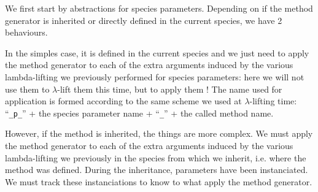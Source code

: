 We first start by abstractions for species parameters. Depending on if
the method generator is inherited or directly defined in the current
species, we have 2 behaviours.

In the simples case, it is defined in the current species and we just
need to apply the method generator to each of the extra arguments
induced by the various lambda-lifting we previously performed for
species parameters: here we will not use them to $\lambda$-lift them
this time, but to apply them ! The name used for application is formed
according to the same scheme we used at $\lambda$-lifting time:
``{\tt \_p\_}'' + the species parameter name + ``{\tt \_}'' + the
called method name.

However, if the method is inherited, the things are more complex. We
must apply the method generator to each of the extra arguments induced
by the various lambda-lifting we previously in the species from which
we inherit, i.e. where the method was defined. During the inheritance,
parameters have been instanciated. We must track these instanciations
to know to what apply the method generator.


